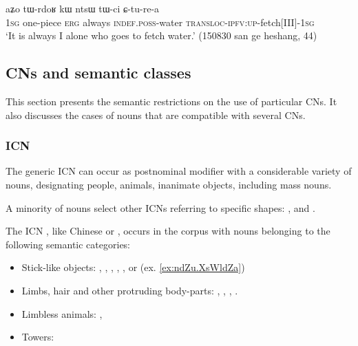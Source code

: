 \begin{exe}
\ex \label{ex:aZo.tWrdoR}
\gll  aʑo tɯ-rdoʁ kɯ ntsɯ tɯ-ci ɕ-tu-re-a \\
\textsc{1sg} one-piece \textsc{erg} always \textsc{indef}.\textsc{poss}-water \textsc{transloc}-\textsc{ipfv}:\textsc{up}-fetch[III]-\textsc{1sg} \\
\glt `It is always I alone who goes to fetch water.' (150830 san ge heshang, 44)
\end{exe}

\subsection{CNs and semantic classes} \label{sec:CN.classification}

This section presents the semantic restrictions on the use of particular CNs. It also discusses the cases of nouns that are compatible with several CNs.

\subsubsection{ICN}
The generic ICN  can occur as postnominal modifier with a considerable variety of nouns, designating people, animals, inanimate objects, including mass nouns.

A minority of nouns select other ICNs referring to specific shapes: ,  and .

 
The ICN , like Chinese  or , occurs in the corpus with nouns belonging to the following semantic categories:

\begin{itemize}
\item Stick-like objects:  , , , ,  ,     or  (ex. \ref{ex:ndZu.XsWldZa})
\item Limbs, hair and other protruding body-parts: , ,  , .
\item Limbless animals:  ,  
\item Towers: 
\end{itemize} 

